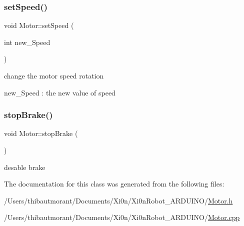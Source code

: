 \subsubsection{\texorpdfstring{set\+Speed()}{setSpeed()}}
{\footnotesize\ttfamily void Motor\+::set\+Speed (\begin{DoxyParamCaption}\item[{int}]{new\+\_\+\+Speed }\end{DoxyParamCaption})}



change the motor speed rotation 

new\+\_\+\+Speed \+: the new value of speed \mbox{\label{class_motor_aeeb75807f8bda1d83456590e740b3c32}} 
\subsubsection{\texorpdfstring{stop\+Brake()}{stopBrake()}}
{\footnotesize\ttfamily void Motor\+::stop\+Brake (\begin{DoxyParamCaption}{ }\end{DoxyParamCaption})}



desable brake 



The documentation for this class was generated from the following files\+:\begin{DoxyCompactItemize}
\item 
/\+Users/thibautmorant/\+Documents/\+Xi0n/\+Xi0n\+Robot\+\_\+\+A\+R\+D\+U\+I\+N\+O/\hyperlink{_motor_8h}{Motor.\+h}\item 
/\+Users/thibautmorant/\+Documents/\+Xi0n/\+Xi0n\+Robot\+\_\+\+A\+R\+D\+U\+I\+N\+O/\hyperlink{_motor_8cpp}{Motor.\+cpp}\end{DoxyCompactItemize}
